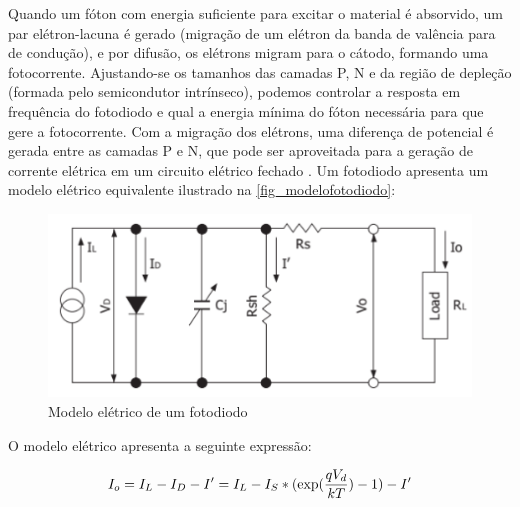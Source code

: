 Quando um fóton com energia suficiente para excitar o material \'e absorvido, um par el\'etron-lacuna \'e gerado (migração de um el\'etron da banda de valência para de condução), e por difusão, os el\'etrons migram para o cátodo, formando uma fotocorrente. Ajustando-se os tamanhos das camadas P, N e da região de depleção (formada pelo semicondutor intrínseco), podemos controlar a resposta em frequência do fotodiodo e qual a energia mínima do fóton necessária para que gere a fotocorrente. Com a migração dos el\'etrons, uma diferença de potencial \'e gerada entre as camadas P e N, que pode ser aproveitada para a geração de corrente el\'etrica em um circuito el\'etrico fechado \cite{hamamatsu}.
Um fotodiodo apresenta um modelo el\'etrico equivalente ilustrado na \autoref{fig_modelofotodiodo}:

\begin{figure}[!h]
	\caption{\label{fig_modelofotodiodo}Modelo el\'etrico de um fotodiodo}
	\begin{center}
	    \includegraphics[scale=0.5]{Imagens/ModeloFotodiodo.png}
	\end{center}
	\label{modeloElFotodiodo}
\end{figure}

    O modelo el\'etrico apresenta a seguinte expressão:

\begin{equation}
    \label{eq_modEletFot}
    I_o = I_L - I_D - I\rq = I_L - I_S*(\exp (\frac{qV_d}{kT})-1) - I\rq
\end{equation}

